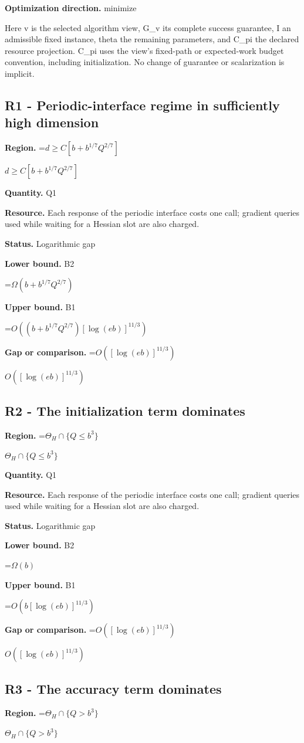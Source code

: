 \documentclass[10pt,a4paper]{article}
\newcommand{\AtlasMath}[1]{\par\begingroup\centering\setbox0=\hbox{$\displaystyle #1$}\ifdim\wd0>1.4\linewidth\typeout{ATLAS WIDE FORMULA: \the\wd0}\fi\ifdim\wd0>\linewidth\resizebox{\linewidth}{!}{\box0}\else\box0\fi\par\endgroup}
\newcommand{\AtlasInlineMath}[1]{\begingroup\setbox0=\hbox{$#1$}\ifdim\wd0>.4\linewidth\endgroup\AtlasMath{#1}\else\endgroup$#1$\fi}
\begin{document}
\textbf{Optimization direction.} minimize

Here v is the selected algorithm view, G\_v its complete success guarantee, I an admissible fixed instance, theta the remaining parameters, and C\_pi the declared resource projection. C\_pi uses the view's fixed-path or expected-work budget convention, including initialization. No change of guarantee or scalarization is implicit.

\subsection{R1 - Periodic-interface regime in sufficiently high dimension}
\textbf{Region.} \AtlasInlineMath{d\ge C[b+b^{1/7}Q^{2/7}]}

\textbf{Quantity.} Q1

\textbf{Resource.} Each response of the periodic interface costs one call; gradient queries used while waiting for a Hessian slot are also charged.

\textbf{Status.} Logarithmic gap

\textbf{Lower bound.} B2

\AtlasMath{\Omega(b+b^{1/7}Q^{2/7})}
\textbf{Upper bound.} B1

\AtlasMath{O((b+b^{1/7}Q^{2/7})[\log(eb)]^{11/3})}
\textbf{Gap or comparison.} \AtlasInlineMath{O([\log(eb)]^{11/3})}

\subsection{R2 - The initialization term dominates}
\textbf{Region.} \AtlasInlineMath{\Theta_H\cap\{Q\le b^3\}}

\textbf{Quantity.} Q1

\textbf{Resource.} Each response of the periodic interface costs one call; gradient queries used while waiting for a Hessian slot are also charged.

\textbf{Status.} Logarithmic gap

\textbf{Lower bound.} B2

\AtlasMath{\Omega(b)}
\textbf{Upper bound.} B1

\AtlasMath{O(b[\log(eb)]^{11/3})}
\textbf{Gap or comparison.} \AtlasInlineMath{O([\log(eb)]^{11/3})}

\subsection{R3 - The accuracy term dominates}
\textbf{Region.} \AtlasInlineMath{\Theta_H\cap\{Q>b^3\}}
\end{document}
